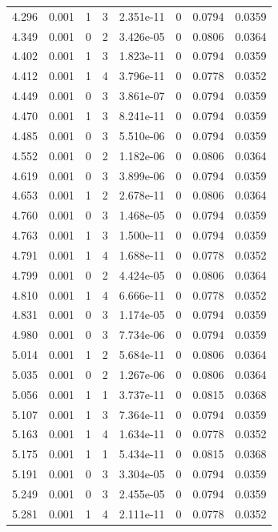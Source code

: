 \documentclass[preview]{standalone}
\begin{document}
{{{\begin{tabular}{L{1.2cm}C{1.2cm} C{0.3cm}C{0.5cm} C{1.4cm}C{1.4cm} C{1.4cm}C{1.4cm}}
  4.296  &  0.001  & 1     &  3 &  2.351e-11  & 0  & 0.0794 &  0.0359   \\ 
  4.349  &  0.001  & 0     &  2 &  3.426e-05  & 0  & 0.0806 &  0.0364   \\ 
  4.402  &  0.001  & 1     &  3 &  1.823e-11  & 0  & 0.0794 &  0.0359   \\ 
  4.412  &  0.001  & 1     &  4 &  3.796e-11  & 0  & 0.0778 &  0.0352   \\ 
  4.449  &  0.001  & 0     &  3 &  3.861e-07  & 0  & 0.0794 &  0.0359   \\ 
  4.470  &  0.001  & 1     &  3 &  8.241e-11  & 0  & 0.0794 &  0.0359   \\ 
  4.485  &  0.001  & 0     &  3 &  5.510e-06  & 0  & 0.0794 &  0.0359   \\ 
  4.552  &  0.001  & 0     &  2 &  1.182e-06  & 0  & 0.0806 &  0.0364   \\ 
  4.619  &  0.001  & 0     &  3 &  3.899e-06  & 0  & 0.0794 &  0.0359   \\ 
  4.653  &  0.001  & 1     &  2 &  2.678e-11  & 0  & 0.0806 &  0.0364   \\ 
  4.760  &  0.001  & 0     &  3 &  1.468e-05  & 0  & 0.0794 &  0.0359   \\ 
  4.763  &  0.001  & 1     &  3 &  1.500e-11  & 0  & 0.0794 &  0.0359   \\ 
  4.791  &  0.001  & 1     &  4 &  1.688e-11  & 0  & 0.0778 &  0.0352   \\ 
  4.799  &  0.001  & 0     &  2 &  4.424e-05  & 0  & 0.0806 &  0.0364   \\ 
  4.810  &  0.001  & 1     &  4 &  6.666e-11  & 0  & 0.0778 &  0.0352   \\ 
  4.831  &  0.001  & 0     &  3 &  1.174e-05  & 0  & 0.0794 &  0.0359   \\ 
  4.980  &  0.001  & 0     &  3 &  7.734e-06  & 0  & 0.0794 &  0.0359   \\ 
  5.014  &  0.001  & 1     &  2 &  5.684e-11  & 0  & 0.0806 &  0.0364   \\ 
  5.035  &  0.001  & 0     &  2 &  1.267e-06  & 0  & 0.0806 &  0.0364   \\ 
  5.056  &  0.001  & 1     &  1 &  3.737e-11  & 0  & 0.0815 &  0.0368   \\ 
  5.107  &  0.001  & 1     &  3 &  7.364e-11  & 0  & 0.0794 &  0.0359   \\ 
  5.163  &  0.001  & 1     &  4 &  1.634e-11  & 0  & 0.0778 &  0.0352   \\ 
  5.175  &  0.001  & 1     &  1 &  5.434e-11  & 0  & 0.0815 &  0.0368   \\ 
  5.191  &  0.001  & 0     &  3 &  3.304e-05  & 0  & 0.0794 &  0.0359   \\ 
  5.249  &  0.001  & 0     &  3 &  2.455e-05  & 0  & 0.0794 &  0.0359   \\ 
  5.281  &  0.001  & 1     &  4 &  2.111e-11  & 0  & 0.0778 &  0.0352   \\ 
\hline 
\end{tabular} 

}}}
\end{document}
